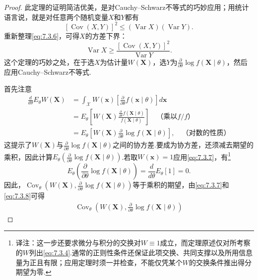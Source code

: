 \begin{proof}
此定理的证明简洁优美，是对Cauchy--Schwarz不等式的巧妙应用；用统计语言说，就是对任意两个随机变量$X$和$Y$都有
\begin{equation}\label{eq:7.3.6}
[\operatorname{Cov}(X,Y)]^2\le(\operatorname{Var}X)(\operatorname{Var}Y).
\end{equation}
重新整理\eqref{eq:7.3.6}，可得$X$的方差下界：
$$\operatorname{Var}X\ge\frac{[\operatorname{Cov}(X,Y)]^2}{\operatorname{Var}Y}.$$
这个定理的巧妙之处，在于选$X$为估计量$W(\boldsymbol X)$，选$Y$为$\frac\partial{\partial\theta}\log f(\boldsymbol X\mid\theta)$，然后应用Cauchy--Schwarz不等式.

首先注意
\begin{equation}\label{eq:7.3.7}
\begin{aligned}
\frac d{d\theta}E_\theta W(\boldsymbol X)&=\int_{\mathcal X}W(\boldsymbol x)\left[\frac\partial{\partial\theta}f(\boldsymbol x\mid\theta)\right]d\boldsymbol x\\
&=E_\theta\left[W(\boldsymbol X)\frac{\frac\partial{\partial\theta}f(\boldsymbol X\mid\theta)}{f(\boldsymbol X\mid\theta)}\right]\quad\text{（乘以$f/f$）}\\
&=E_\theta\left[W(\boldsymbol X)\frac\partial{\partial\theta}\log f(\boldsymbol X\mid\theta)\right],\quad\text{（对数的性质）}
\end{aligned}
\end{equation}
这提示了$W(\boldsymbol X)$与$\frac\partial{\partial\theta}\log f(\boldsymbol X\mid\theta)$之间的协方差.要成为协方差，还须减去期望的乘积，因此计算$E_\theta(\frac\partial{\partial\theta}\log f(\boldsymbol X\mid\theta))$.若取$W(\boldsymbol x)=1$应用\eqref{eq:7.3.7}，有\footnote{译注：这一步还要求微分与积分的交换对$W\equiv1$成立，而定理原述仅对所考察的$W$列出\eqref{eq:7.3.4}.通常的正则性条件还保证此项交换、共同支撑以及所用信息量为正且有限；应用定理时须一并检查，不能仅凭某个$W$的交换条件推出得分期望为零.}
\begin{equation}\label{eq:7.3.8}
E_\theta\left(\frac\partial{\partial\theta}\log f(\boldsymbol X\mid\theta)\right)=\frac d{d\theta}E_\theta[1]=0.
\end{equation}
因此，$\operatorname{Cov}_\theta(W(\boldsymbol X),\frac\partial{\partial\theta}\log f(\boldsymbol X\mid\theta))$等于乘积的期望，由\eqref{eq:7.3.7}和\eqref{eq:7.3.8}可得
\begin{equation}\label{eq:7.3.9}
\begin{aligned}
\operatorname{Cov}_\theta\left(W(\boldsymbol X),\frac\partial{\partial\theta}\log f(\boldsymbol X\mid\theta)\right)

\end{aligned}
\end{equation}
\end{proof}

